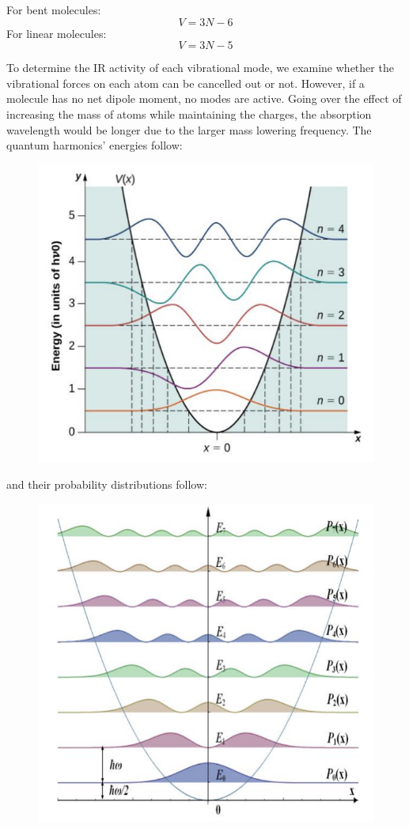 \documentclass[11pt,fleqn]{book}
\begin{document}
\begin{theorem}
	For bent molecules:
	$$V=3N-6$$
	For linear molecules:
	$$V=3N-5$$
\end{theorem}

To determine the IR activity of each vibrational mode, we examine whether the vibrational forces on each atom can be cancelled out or not. However, if a molecule has no net dipole moment, no modes are active. Going over the effect of increasing the mass of atoms while maintaining the charges, the absorption wavelength would be longer due to the larger mass lowering frequency. The quantum harmonics' energies follow:
\begin{figure}[h!]
	\begin{center}
		\includegraphics[width=0.37\linewidth]{Pictures/energy.png}
	\end{center}
	\caption{
	}
\end{figure}

and their probability distributions follow:
\begin{figure}[h!]
\begin{center}
	\includegraphics[width=0.4\linewidth]{Pictures/prob.png}
\end{center}
\caption{
}
\end{figure}
\end{document}
